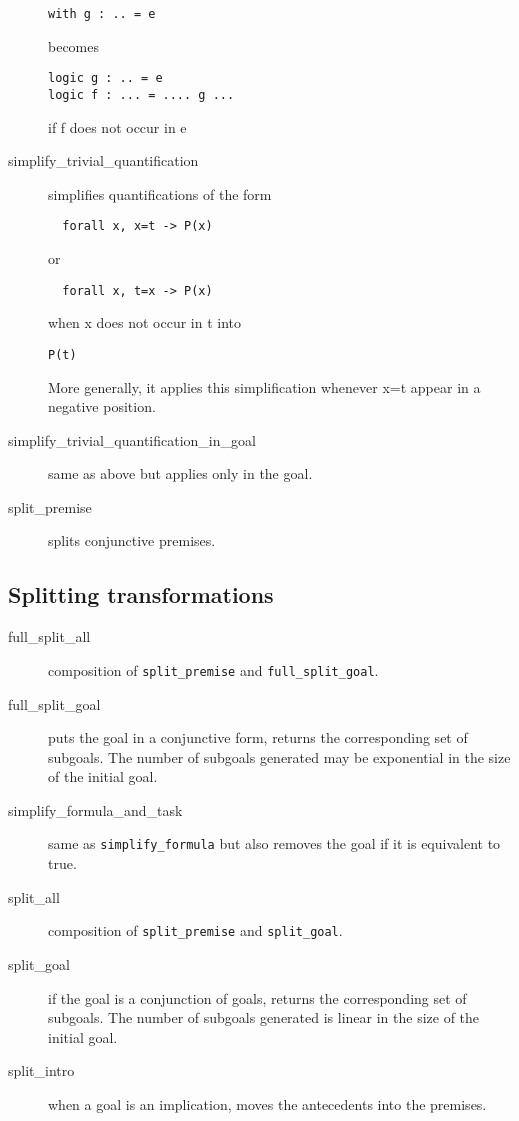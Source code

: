 \begin{description}
\begin{verbatim}
with g : .. = e
\end{verbatim}
becomes
\begin{verbatim}
logic g : .. = e
logic f : ... = .... g ...
\end{verbatim}
if f does not occur in e

\item[simplify\_trivial\_quantification]
  simplifies quantifications of the form
\begin{verbatim}
  forall x, x=t -> P(x)
\end{verbatim}
or
\begin{verbatim}
  forall x, t=x -> P(x)
\end{verbatim}
  when x does not occur in t
  into 
\begin{verbatim}
P(t)
\end{verbatim}
  More generally, it applies this simplification whenever x=t appear
  in a negative position.
  
\item[simplify\_trivial\_quantification\_in\_goal]
  same as above but applies only in the goal.

\item[split\_premise]
  splits conjunctive premises.

\end{description}

\subsection{Splitting transformations}

\begin{description}

\item[full\_split\_all]
  composition of \texttt{split\_premise} and \texttt{full\_split\_goal}.

\item[full\_split\_goal] puts the goal in a conjunctive form,
  returns the corresponding set of subgoals. The number of subgoals
  generated may be exponential in the size of the initial goal.

\item[simplify\_formula\_and\_task] same as \texttt{simplify\_formula}
  but also removes the goal if it is equivalent to true.

\item[split\_all]
  composition of \texttt{split\_premise} and \texttt{split\_goal}.

\item[split\_goal] if the goal is a conjunction of goals, returns the
  corresponding set of subgoals. The number of subgoals generated is linear in
  the size of the initial goal.

\item[split\_intro]
  when a goal is an implication, moves the antecedents into the premises.

\end{description}



